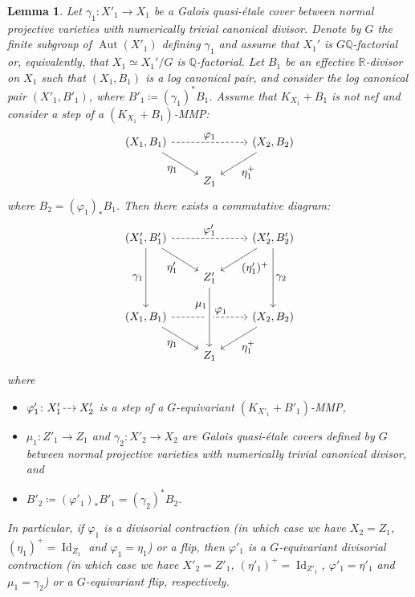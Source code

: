 \documentclass[JEP,XML,SOM,Unicode,published]{cedram}
\let\ts\textstyle
\newcommand{\dradpl}{{\hspace*{-2.5mm}\begin{tikzcd}[ampersand replacement=\&,column sep = scriptsize]\mbox{}\ar[r,dashed]\&\mbox{}\end{tikzcd}\hspace*{-2.5mm}}}
\newcommand{\dratst}{{\hspace*{-2.5mm}\begin{tikzcd}[ampersand replacement=\&,column sep = small]\mbox{}\ar[r,dashed]\&\mbox{}\end{tikzcd}\hspace*{-2mm}}}
\let\drascst\dratst
\newcommand{\dra}{\mathchoice{\dradpl}{\dratst}{\drascst}{\drascst}}
\theoremstyle{plain}
\newtheorem{lem}[thm]{Lemma}
\theoremstyle{definition}
\newcommand{\Q}{\mathbb{Q}}
\newcommand{\R}{\mathbb{R}}
\DeclareMathOperator{\Id}{Id}
\DeclareMathOperator{\Aut}{Aut}
\begin{document}
\begin{lem}
\label{lem:lifting_MMP_step}
Let $\gamma_1 \colon X'_1 \to X_1$ be a Galois quasi-étale cover between normal projective varieties with numerically trivial canonical divisor. Denote by $G$ the finite subgroup of $\Aut(X'_1)$ defining $\gamma_1$ and assume that $X_1'$ is $G\Q$-factorial or, equivalently, that $X_1 \simeq X_1' /G$ is $\Q$\nobreakdash-factorial. Let $B_1$ be an effective $\R$\nobreakdash-divisor on $X_1$ such that $(X_1, B_1)$ is a log canonical pair, and consider the log canonical pair $(X'_1,B'_1)$, where $B'_1 \coloneqq (\gamma_1)^* B_1$. Assume that $K_{X_1} + B_1$ is not nef and consider a step of a $(K_{X_1}+B_1)$-MMP:
\[
\begin{tikzcd}
(X_1, B_1) \arrow[rr, "\ts \varphi_1", dashed] \arrow[dr, "\ts \eta_1" swap] && (X_2, B_2) \arrow[dl, "\ts \eta_1^+"] \\
& Z_1
\end{tikzcd}
\]
where $B_2 = (\varphi_1)_* B_1$.
Then there exists a commutative diagram:
\[
\begin{tikzcd}
(X'_1,B'_1) \arrow[dd, "\ts \gamma_1" swap] \arrow[rr, "\ts \varphi'_1", dashed] \arrow[dr, "\ts \eta'_1" swap] && (X'_2, B'_2) \arrow[dl, "\ts (\eta'_1)^+"] \arrow[dd, "\ts \gamma_2"] \\
& Z'_1 \arrow[dd, "\ts \mu_1", pos=0.3, swap] \\
(X_1, B_1) \arrow[rr, "\ts \varphi_1", pos=0.65, dashed] \arrow[dr, "\ts \eta_1" swap] && (X_2, B_2) \arrow[dl, "\ts \eta_1^+"] \\
& Z_1\arrow[uu,leftarrow, crossing over]
\end{tikzcd}
\]
where
\begin{itemize}
\item
$\varphi'_1 \colon X'_1 \dra X'_2$ is a step of a $G$\nobreakdash-equivariant $(K_{X'_1}+B'_1)$-MMP,

\item
$\mu_1 \colon Z'_1 \to Z_1$ and $\gamma_2 \colon X'_2 \to X_2$ are Galois quasi-étale covers defined by $G$ between normal projective varieties with numerically trivial canonical divisor, and

\item
$B'_2 \coloneqq (\varphi'_1)_* B'_1 = (\gamma_2)^* B_2$.
\end{itemize}
In particular, if $\varphi_1$ is a divisorial contraction (in which case we have $X_2 = Z_1$, $(\eta_1)^+ = \Id_{Z_1}$ and $\varphi_1 = \eta_1$) or a flip, then $\varphi'_1$ is a $G$\nobreakdash-equivariant divisorial contraction (in which case we have $X'_2 = Z'_1$, $(\eta'_1)^+ = \Id_{Z'_1}$, $\varphi'_1 = \eta'_1$ and $\mu_1 = \gamma_2$) or a $G$\nobreakdash-equivariant flip, respectively.
\end{lem}
\end{document}
